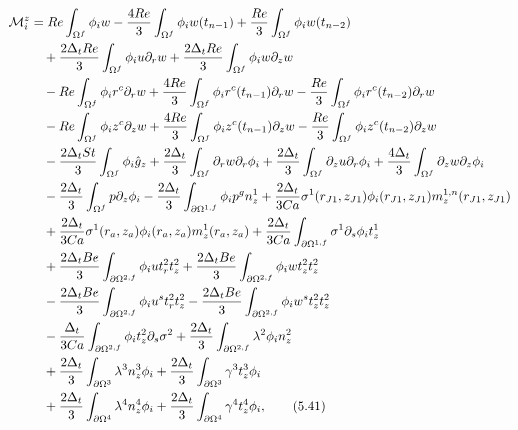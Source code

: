 \documentclass{article}
\begin{document}
\begin{align}
\mathcal{M}_i^z &= Re \int_{\Omega^f} \phi_i w - \frac{4Re}{3} \int_{\Omega^f} \phi_i w(t_{n-1}) + \frac{Re}{3} \int_{\Omega^f} \phi_i w(t_{n-2}) \nonumber\\
&\quad + \frac{2\Delta_t Re}{3} \int_{\Omega^f} \phi_i u \partial_r w + \frac{2\Delta_t Re}{3} \int_{\Omega^f} \phi_i w \partial_z w \nonumber\\
&\quad - Re \int_{\Omega^f} \phi_i r^c \partial_r w + \frac{4Re}{3} \int_{\Omega^f} \phi_i r^c(t_{n-1}) \partial_r w - \frac{Re}{3} \int_{\Omega^f} \phi_i r^c(t_{n-2}) \partial_r w \nonumber\\
&\quad - Re \int_{\Omega^f} \phi_i z^c \partial_z w + \frac{4Re}{3} \int_{\Omega^f} \phi_i z^c(t_{n-1}) \partial_z w - \frac{Re}{3} \int_{\Omega^f} \phi_i z^c(t_{n-2}) \partial_z w \nonumber\\
&\quad - \frac{2\Delta_t St}{3} \int_{\Omega^f} \phi_i \hat{g}_z + \frac{2\Delta_t}{3} \int_{\Omega^f} \partial_r w \partial_r \phi_i + \frac{2\Delta_t}{3} \int_{\Omega^f} \partial_z u \partial_r \phi_i + \frac{4\Delta_t}{3} \int_{\Omega^f} \partial_z w \partial_z \phi_i \nonumber\\
&\quad - \frac{2\Delta_t}{3} \int_{\Omega^f} p \partial_z \phi_i - \frac{2\Delta_t}{3} \int_{\partial \Omega^{1,f}} \phi_i p^g n_z^1 + \frac{2\Delta_t}{3Ca} \sigma^1(r_{J1},z_{J1}) \phi_i(r_{J1},z_{J1}) m_z^{1,n}(r_{J1},z_{J1}) \nonumber\\
&\quad + \frac{2\Delta_t}{3Ca} \sigma^1(r_a,z_a) \phi_i(r_a,z_a) m_z^{1}(r_a,z_a) + \frac{2\Delta_t}{3Ca} \int_{\partial \Omega^{1,f}} \sigma^1 \partial_s \phi_i t_z^1 \nonumber\\
&\quad + \frac{2\Delta_t Be}{3} \int_{\partial \Omega^{2,f}} \phi_i u t_r^2 t_z^2 + \frac{2\Delta_t Be}{3} \int_{\partial \Omega^{2,f}} \phi_i w t_z^2 t_z^2 \nonumber\\
&\quad - \frac{2\Delta_t Be}{3} \int_{\partial \Omega^{2,f}} \phi_i u^s t_r^2 t_z^2 - \frac{2\Delta_t Be}{3} \int_{\partial \Omega^{2,f}} \phi_i w^s t_z^2 t_z^2 \nonumber\\
&\quad - \frac{\Delta_t}{3Ca} \int_{\partial \Omega^{2,f}} \phi_i t_z^2 \partial_s \sigma^2 + \frac{2\Delta_t}{3} \int_{\partial \Omega^{2,f}} \lambda^2 \phi_i n_z^2 \nonumber\\
&\quad + \frac{2\Delta_t}{3} \int_{\partial \Omega^{3}} \lambda^3 n_z^3 \phi_i + \frac{2\Delta_t}{3} \int_{\partial \Omega^{3}} \gamma^3 t_z^3 \phi_i \nonumber\\
&\quad + \frac{2\Delta_t}{3} \int_{\partial \Omega^{4}} \lambda^4 n_z^4 \phi_i + \frac{2\Delta_t}{3} \int_{\partial \Omega^{4}} \gamma^4 t_z^4 \phi_i, \tag{5.41}
\end{align}
\end{document}
